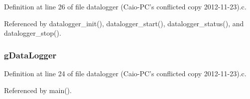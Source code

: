 Definition at line 26 of file datalogger (\-Caio-\/\-P\-C's conflicted copy 2012-\/11-\/23).\-c.



Referenced by datalogger\-\_\-init(), datalogger\-\_\-start(), datalogger\-\_\-status(), and datalogger\-\_\-stop().

\hypertarget{datalogger_01_07Caio-PC's_01conflicted_01copy_012012-11-23_08_8c_abe3b9c2c4e21e79c7b046b5986d13acc}{
\subsubsection[{g\-Data\-Logger}]{ g\-Data\-Logger}}\label{datalogger_01_07Caio-PC's_01conflicted_01copy_012012-11-23_08_8c_abe3b9c2c4e21e79c7b046b5986d13acc}


Definition at line 24 of file datalogger (\-Caio-\/\-P\-C's conflicted copy 2012-\/11-\/23).\-c.



Referenced by main().

